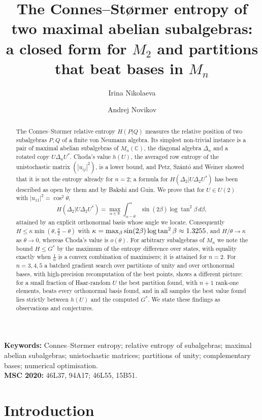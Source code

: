 \documentclass[11pt]{article}
\title{The Connes--St{\o}rmer entropy of two maximal abelian subalgebras:\\
a closed form for $M_2$ and partitions that beat bases in $M_n$}
\author{Irina Nikolaeva \and Andrej Novikov}
\date{}
\newcommand{\C}{\mathbb{C}}
\newcommand{\R}{\mathbb{R}}
\theoremstyle{plain}
\theoremstyle{definition}
\theoremstyle{remark}
\begin{document}
\maketitle

\begin{abstract}
The Connes--St{\o}rmer relative entropy $H(P|Q)$ measures the relative position of two subalgebras $P,Q$ of a finite
von Neumann algebra. Its simplest non-trivial instance is a pair of maximal abelian subalgebras of $M_n(\C)$, the
diagonal algebra $\Delta_n$ and a rotated copy $U\Delta_nU^*$. Choda's value $h(U)$, the averaged row entropy of the
unistochastic matrix $(|u_{ij}|^2)$, is a lower bound, and Petz, Sz\'ant\'o and Weiner showed that it is not the
entropy already for $n=2$; a formula for $H(\Delta_2|U\Delta_2U^*)$ has been described as open by them and by Bakshi and
Guin. We prove that for $U\in U(2)$ with $|u_{11}|^2=\cos^2\theta$,
\[
  H(\Delta_2|U\Delta_2U^*)=\max_{\alpha\in\R}\int_{\alpha-\theta}^{\alpha}\sin(2\beta)\log\tan^2\beta\,d\beta,
\]
attained by an explicit orthonormal basis whose angle we locate. Consequently $H\le\kappa\min(\theta,\frac\pi2-\theta)$
with $\kappa=\max_\beta\sin(2\beta)\log\tan^2\beta\approx1.3255$, and $H/\theta\to\kappa$ as $\theta\to0$, whereas Choda's
value is $o(\theta)$. For arbitrary subalgebras of $M_n$ we note the bound $H\le G^*$ by the maximum of the entropy
difference over states, with equality exactly when $\frac1n$ is a convex combination of maximisers; it is attained for
$n=2$. For $n=3,4,5$ a batched gradient search over partitions of unity and over orthonormal bases, with
high-precision recomputation of the best points, shows a different picture: for a small fraction of Haar-random $U$
the best partition found, with $n+1$ rank-one elements, beats every orthonormal basis found, and in all samples the best
value found lies strictly between $h(U)$ and the computed $G^*$. We state these findings as observations and conjectures.
\end{abstract}

\noindent\textbf{Keywords:} Connes--St{\o}rmer entropy; relative entropy of subalgebras; maximal abelian
subalgebras; unistochastic matrices; partitions of unity; complementary bases; numerical optimisation.\\
\textbf{MSC 2020:} 46L37, 94A17; 46L55, 15B51.

\section{Introduction}\label{sec:intro}
\end{document}
